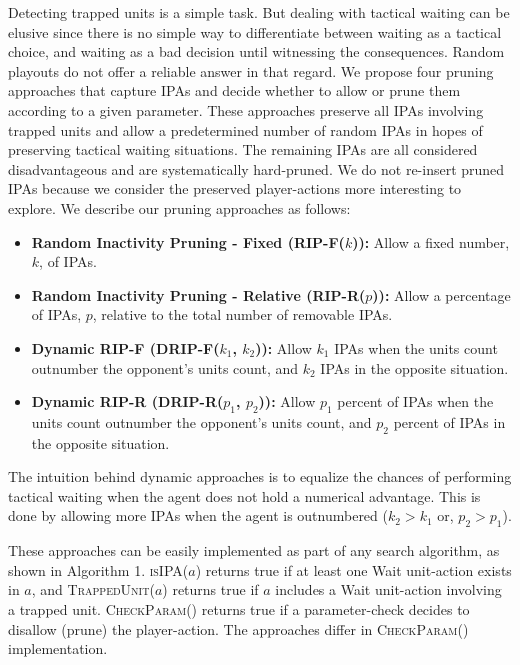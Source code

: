 \documentclass[conference]{IEEEtran}
\begin{document}
Detecting trapped units is a simple task. But dealing with tactical waiting can be elusive since there is no simple way to differentiate between waiting as a tactical choice, and waiting as a bad decision until witnessing the consequences. Random playouts do not offer a reliable answer in that regard. We propose four pruning approaches that capture IPAs and decide whether to allow or prune them according to a given parameter. These approaches preserve all IPAs involving trapped units and allow a predetermined number of random IPAs in hopes of preserving tactical waiting situations. The remaining IPAs are all considered disadvantageous and are systematically hard-pruned. We do not re-insert pruned IPAs because we consider the preserved player-actions more interesting to explore. We describe our pruning approaches as follows:

\begin{itemize}
\item \textbf{Random Inactivity Pruning - Fixed (RIP-F($k$)):} Allow a fixed number, $k$, of IPAs.
\item \textbf{Random Inactivity Pruning - Relative (RIP-R($p$)):} Allow a percentage of IPAs, $p$, relative to the total number of removable IPAs.
\item \textbf{Dynamic RIP-F (DRIP-F($k_1$, $k_2$)):} Allow $k_1$ IPAs when the units count outnumber the opponent's units count, and $k_2$ IPAs in the opposite situation.
\item \textbf{Dynamic RIP-R (DRIP-R($p_1$, $p_2$)):} Allow $p_1$ percent of IPAs when the units count outnumber the opponent's units count, and $p_2$ percent of IPAs in the opposite situation.
\end{itemize}

The intuition behind dynamic approaches is to equalize the chances of performing tactical waiting when the agent does not hold a numerical advantage. This is done by allowing more IPAs when the agent is outnumbered ($k_2 > k_1$ or, $p_2 > p_1$).

These approaches can be easily implemented as part of any search algorithm, as shown in Algorithm 1. \textsc{isIPA($a$)} returns true if at least one Wait unit-action exists in $a$, and \textsc{TrappedUnit($a$)} returns true if $a$ includes a Wait unit-action involving a trapped unit. \textsc{CheckParam()} returns true if a parameter-check decides to disallow (prune) the player-action. The approaches differ in \textsc{CheckParam()} implementation.

\end{document}
